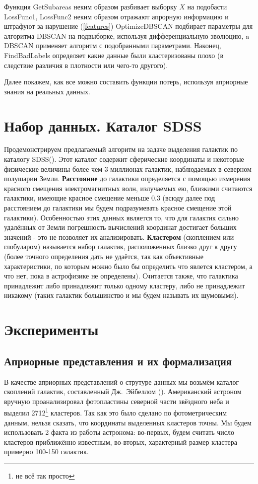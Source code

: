\documentclass[12pt,fleqn]{article}
\begin{document}
Функция GetSubareas  неким образом разбивает выборку $X$ на подобасти
LossFunc1, LossFunc2 неким образом отражают апрорную информацию и штрафуют за нарушение (\ref{features}) 
OptimizeDBSCAN подбирает параметры для алгоритма DBSCAN на подвыборке, используя дифференциальную эволюцию, a DBSCAN применяет алгоритм с подобранными параметрами. Наконец, FindBadLabels определяет какие данные были кластеризованы плохо (в следствие различия в плотности или чего-то другого).

Далее покажем, как все можно составить функции потерь, используя априорные знания на реальных данных.

\section{Набор данных. Каталог SDSS}

Продемонстрируем предлагаемый алгоритм на задаче выделения галактик по каталогу SDSS(\cite{SDSS}). Этот каталог содержит сферические координаты и некоторые физические величины более чем 3 миллионах галактик, наблюдаемых в северном полушарии Земли. \textbf{Расстояние} до галактики определяется с помощью измерения красного смещения электромагнитных волн, излучаемых ею, близкими считаются галактики, имеющие красное смещение меньше 0.3 (всюду далее под расстоянием до галактики мы будем подразумевать красное смещение этой галактики). Особенностью этих данных является то, что для галактик сильно удалённых от Земли погрешность вычислений координат достигает больших значений - это не позволяет их анализировать. \textbf{Кластером} (скоплением или глобуларом) называется набор галактик, расположенных близко друг к другу (более точного определения дать не удаётся, так как объективные характеристики, по которым можно было бы определить что явлется кластером, а что нет, пока в астрофизике не определены). Считается также, что галактика принадлежит либо принадлежит только одному кластеру, либо не принадлежит никакому (таких галактик большинство и мы будем называть их шумовыми).


\section{Эксперименты}
\subsection{Априорные представления и их формализация}

В качестве априорных представлений о струтуре данных мы возьмём каталог скоплений галактик, составленный Дж.~Эйбеллом (\cite{Abell}). Американский астроном вручную проанализировал фотопластины северной части звёздного неба и выделил 2712\footnote{не всё так просто} кластеров. Так как это было сделано по фотометрическим данным, нельзя сказать, что координаты выделенных кластеров точны. Мы будем использовать 2 факта из работы астронома: во-первых, будем считать число кластеров приближённо известным, во-вторых, характерный размер кластера примерно 100-150 галактик.
\end{document}
